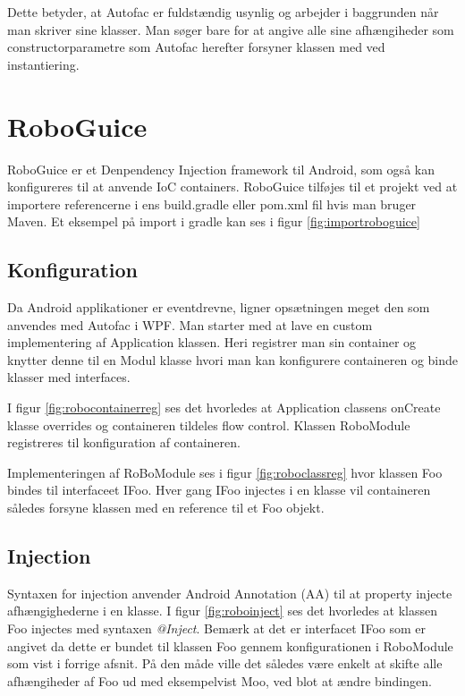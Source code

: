Dette betyder, at Autofac er fuldstændig usynlig og arbejder i baggrunden når man skriver sine klasser. Man søger bare for at angive alle sine afhængiheder som constructorparametre som Autofac herefter forsyner klassen med ved instantiering.

\section{RoboGuice}
RoboGuice er et Denpendency Injection framework til Android, som også kan konfigureres til at anvende IoC containers. RoboGuice tilføjes til et projekt ved at importere referencerne i ens build.gradle eller pom.xml fil hvis man bruger Maven. Et eksempel på import i gradle kan ses i figur \ref{fig:importroboguice}


\FloatBarrier
\subsection{Konfiguration}
Da Android applikationer er eventdrevne, ligner opsætningen meget den som anvendes med Autofac i WPF. Man starter med at lave en custom implementering af Application klassen. Heri registrer man sin container og knytter denne til en Modul klasse hvori man kan konfigurere containeren og binde klasser med interfaces.

I figur \ref{fig:robocontainerreg} ses det hvorledes at Application classens onCreate klasse overrides og containeren tildeles flow control. Klassen RoboModule registreres til konfiguration af containeren.


Implementeringen af RoBoModule ses i figur \ref{fig:roboclassreg} hvor klassen Foo bindes til interfaceet IFoo. Hver gang IFoo injectes i en klasse vil containeren således forsyne klassen med en reference til et Foo objekt.


\FloatBarrier
\subsection{Injection}
Syntaxen for injection anvender Android Annotation (AA) til at property injecte afhængighederne i en klasse. I figur \ref{fig:roboinject} ses det hvorledes at klassen Foo injectes med syntaxen \emph{@Inject}. Bemærk at det er interfacet IFoo som er angivet da dette er bundet til klassen Foo gennem konfigurationen i RoboModule som vist i forrige afsnit. På den måde ville det således være enkelt at skifte alle afhængiheder af Foo ud med eksempelvist Moo, ved blot at ændre bindingen.

